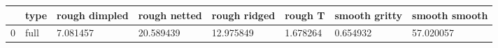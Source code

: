 \begin{tabular}{llllllll}
\toprule
{} &  type & rough dimpled & rough netted & rough ridged &   rough T & smooth gritty & smooth smooth \\
\midrule
0 &  full &      7.081457 &    20.589439 &    12.975849 &  1.678264 &      0.654932 &     57.020057 \\
\bottomrule
\end{tabular}
